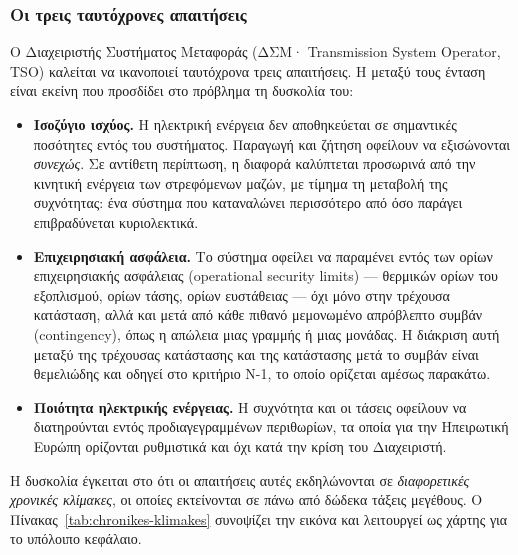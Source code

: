 \subsubsection*{Οι τρεις ταυτόχρονες απαιτήσεις}

Ο Διαχειριστής Συστήματος Μεταφοράς (ΔΣΜ· Transmission System Operator, TSO) καλείται να
ικανοποιεί ταυτόχρονα τρεις απαιτήσεις. Η μεταξύ τους ένταση είναι εκείνη που προσδίδει
στο πρόβλημα τη δυσκολία του:

\begin{itemize}
\item \textbf{Ισοζύγιο ισχύος.} Η ηλεκτρική ενέργεια δεν αποθηκεύεται σε σημαντικές
      ποσότητες εντός του συστήματος. Παραγωγή και ζήτηση οφείλουν να εξισώνονται
      \emph{συνεχώς}. Σε αντίθετη περίπτωση, η διαφορά καλύπτεται προσωρινά από την
      κινητική ενέργεια των στρεφόμενων μαζών, με τίμημα τη μεταβολή της συχνότητας: ένα
      σύστημα που καταναλώνει περισσότερο από όσο παράγει επιβραδύνεται κυριολεκτικά.
\item \textbf{Επιχειρησιακή ασφάλεια.} Το σύστημα οφείλει να παραμένει εντός των ορίων
      επιχειρησιακής ασφάλειας (operational security limits) — θερμικών ορίων του
      εξοπλισμού, ορίων τάσης, ορίων ευστάθειας — όχι μόνο στην τρέχουσα κατάσταση, αλλά
      και μετά από κάθε πιθανό μεμονωμένο απρόβλεπτο συμβάν (contingency), όπως η απώλεια
      μιας γραμμής ή μιας μονάδας. Η διάκριση αυτή μεταξύ της τρέχουσας κατάστασης και της
      κατάστασης μετά το συμβάν είναι θεμελιώδης και οδηγεί στο κριτήριο N-1, το οποίο ορίζεται αμέσως παρακάτω.
\item \textbf{Ποιότητα ηλεκτρικής ενέργειας.} Η συχνότητα και οι τάσεις οφείλουν να διατηρούνται εντός
      προδιαγεγραμμένων περιθωρίων, τα οποία για την Ηπειρωτική Ευρώπη ορίζονται
      ρυθμιστικά και όχι κατά την κρίση του Διαχειριστή.
\end{itemize}

Η δυσκολία έγκειται στο ότι οι απαιτήσεις αυτές εκδηλώνονται σε \emph{διαφορετικές χρονικές
κλίμακες}, οι οποίες εκτείνονται σε πάνω από δώδεκα τάξεις μεγέθους. Ο
Πίνακας~\ref{tab:chronikes-klimakes} συνοψίζει την εικόνα και λειτουργεί ως χάρτης για το
υπόλοιπο κεφάλαιο.

